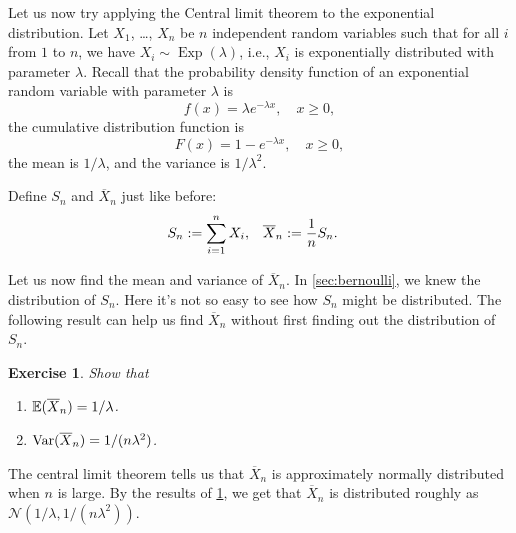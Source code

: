 \documentclass[12pt]{article}
\newcommand*{\Xbar}{\overline{X}}
\newcommand*{\Ncal}{\mathcal{N}}
\DeclareMathOperator{\Exp}{Exp}
\newtheorem{exercise}{Exercise}[section]
\begin{document}
Let us now try applying the Central limit theorem to the exponential distribution.
Let $X_1$, \ldots, $X_n$ be $n$ independent random variables such that for
all $i$ from $1$ to $n$, we have $X_i \sim \Exp(\lambda)$,
i.e., $X_i$ is exponentially distributed with parameter $\lambda$.
Recall that the probability density function of
an exponential random variable with parameter $\lambda$ is
\[ f(x) = \lambda e^{-\lambda x}, \quad x \ge 0, \]
the cumulative distribution function is
\[ F(x) = 1 - e^{-\lambda x}, \quad x \ge 0, \]
the mean is $1/\lambda$, and the variance is $1/\lambda^2$.

Define $S_n$ and $\Xbar_n$ just like before:
\begin{align*}
S_n &\defeq \sum_{i=1}^n X_i,
& \Xbar_n &\defeq \frac{1}{n}S_n.
\end{align*}

Let us now find the mean and variance of $\Xbar_n$.
In \cref{sec:bernoulli}, we knew the distribution of $S_n$.
Here it's not so easy to see how $S_n$ might be distributed.
The following result can help us find $\Xbar_n$
without first finding out the distribution of $S_n$.

\begin{tcolorbox}[myres]
\end{tcolorbox}

\begin{tcolorbox}[mathExe]
\begin{exercise}
\label{exe:exp:mean-var}
Show that
\begin{enumerate}[label=(\alph*)]
\item $\E(\Xbar_n) = 1/\lambda$.
\item $\Var(\Xbar_n) = 1/(n\lambda^2)$.
\end{enumerate}
\end{exercise}
\end{tcolorbox}

The central limit theorem tells us that $\Xbar_n$ is approximately
normally distributed when $n$ is large.
By the results of \cref{exe:exp:mean-var}, we get that
$\Xbar_n$ is distributed roughly as $\Ncal(1/\lambda, 1/(n\lambda^2))$.
\end{document}
